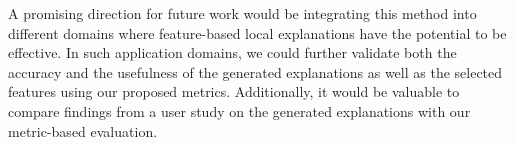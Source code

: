\documentclass{article}
\begin{document}
A promising direction for future work would be integrating this method into different domains where feature-based local explanations have the potential to be effective. In such application domains, we could further validate both the accuracy and the usefulness of the generated explanations as well as the selected features using our proposed metrics. Additionally, it would be valuable to compare findings from a user study on the generated explanations with our metric-based evaluation.
	\newpage
	\sloppy
	\printbibliography
\end{document}
